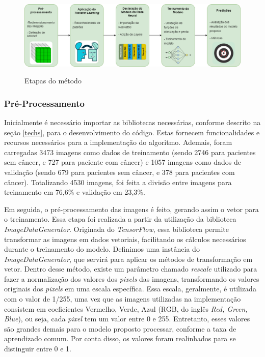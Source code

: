 \begin{figure}[ht]
 	\centering	
 	\caption[\hspace{0.1cm}Grade Computacional.]{Etapas do método}
 	\vspace{-0.2cm}
 	\includegraphics[width=1\textwidth]{figuras/tcc_diagrama.drawio.png}
 	\captionsetup{justification=centering}
	\label{fig:diagrama}
\end{figure}



\subsubsection{\esp Pré-Processamento} \label{preprocess}
Inicialmente é necessário importar as bibliotecas necessárias, conforme descrito na seção \ref{techs}, para o desenvolvimento do código. Estas fornecem funcionalidades e recursos necessários para a implementação do algoritmo. Ademais, foram carregadas 3473 imagens como dados de treinamento (sendo 2746 para pacientes sem câncer, e 727 para paciente com câncer) e 1057 imagens como dados de validação (sendo 679 para pacientes sem câncer, e 378 para pacientes com câncer). Totalizando 4530 imagens, foi feita a divisão entre imagens para treinamento em 76,6\% e validação em 23,3\%.

Em seguida, o pré-processamento das imagens é feito, gerando assim o vetor para o treinamento. Essa etapa foi realizada a partir da utilização da biblioteca \textit{ImageDataGenerator}. Originada do \textit{TensorFlow}, essa biblioteca permite transformar as imagens em dados vetoriais, facilitando os cálculos necessários durante o treinamento do modelo. Definimos uma instância do \textit{ImageDataGenerator}, que servirá para aplicar os métodos de transformação em vetor. Dentro desse método, existe um parâmetro chamado \textit{rescale} utilizado para fazer a normalização dos valores dos \textit{pixels} das imagens, transformando os valores originais dos \textit{pixels} em uma escala específica. Essa escala, geralmente, é utilizada com o valor de 1/255, uma vez que as imagens utilizadas na implementação consistem em coeficientes Vermelho, Verde, Azul (RGB, do inglês \textit{Red, Green, Blue}), ou seja, cada \textit{pixel} tem um valor entre 0 e 255. Entretanto, esses valores são grandes demais para o modelo proposto processar, conforme a taxa de aprendizado comum. Por conta disso, os valores foram realinhados para se distinguir entre 0 e 1.


